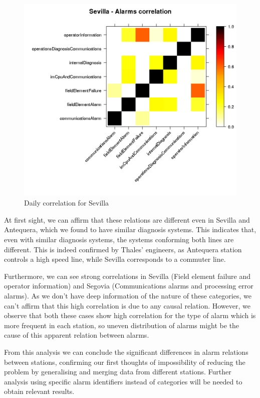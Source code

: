 \begin{figure}[htb]
 \centering
 \includegraphics[width=\textwidth]{./img/sevilla_corr.png}
 \caption{Daily correlation for Sevilla} \label{fig:sevilla_corr}
\end{figure}

\clearpage

At first sight, we can affirm that these relations are different even in Sevilla and Antequera, which we found to have similar diagnosis systems. This indicates that, even with similar diagnosis systems, the systems conforming both lines are different. This is indeed confirmed by Thales' engineers, as Antequera station controls a high speed line, while Sevilla corresponds to a commuter line.

Furthermore, we can see strong correlations in Sevilla (Field element failure and operator information) and Segovia (Communications alarms and processing error alarms). As we don't have deep information of the nature of these categories, we can't affirm that this high correlation is due to any causal relation. However, we observe that both these cases show high correlation for the type of alarm which is more frequent in each station, so uneven distribution of alarms might be the cause of this apparent relation between alarms.

From this analysis we can conclude the significant differences in alarm relations between stations, confirming our first thoughts of impossibility of reducing the problem by generalising and merging data from different stations. Further analysis using specific alarm identifiers instead of categories will be needed to obtain relevant results.

